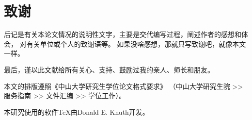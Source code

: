 
\chapter{致谢}

后记是有关本论文情况的说明性文字，主要是交代编写过程，阐述作者的感想和体会，
对有关单位或个人的致谢语等。
如果没啥感想，那就只写致谢吧，就像本文一样。

最后，谨以此文献给所有关心、支持、鼓励过我的亲人、师长和朋友。\nopagebreak

本文的排版遵照《中山大学研究生学位论文格式要求》
（中山大学研究生院 >> 服务指南 >> 文件汇编 >>  学位工作）。

本研究使用的软件\TeX{}由Donald E. Knuth开发。
